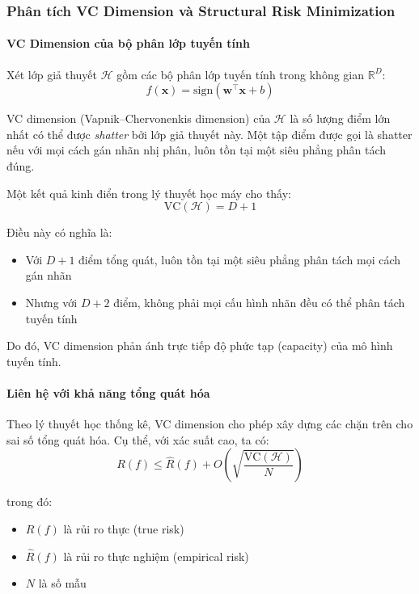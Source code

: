 \subsubsection{Phân tích VC Dimension và Structural Risk Minimization}

\paragraph{VC Dimension của bộ phân lớp tuyến tính}

Xét lớp giả thuyết $\mathcal{H}$ gồm các bộ phân lớp tuyến tính trong không gian $\mathbb{R}^D$:
\[
f(\boldsymbol{x}) = \text{sign}(\boldsymbol{w}^\intercal \boldsymbol{x} + b)
\]

VC dimension (Vapnik–Chervonenkis dimension) của $\mathcal{H}$ là số lượng điểm lớn nhất có thể được \textit{shatter} bởi lớp giả thuyết này. Một tập điểm được gọi là shatter nếu với mọi cách gán nhãn nhị phân, luôn tồn tại một siêu phẳng phân tách đúng.

Một kết quả kinh điển trong lý thuyết học máy cho thấy:
\[
\text{VC}(\mathcal{H}) = D + 1
\]

Điều này có nghĩa là:
\begin{itemize}
    \item Với $D+1$ điểm tổng quát, luôn tồn tại một siêu phẳng phân tách mọi cách gán nhãn
    \item Nhưng với $D+2$ điểm, không phải mọi cấu hình nhãn đều có thể phân tách tuyến tính
\end{itemize}

Do đó, VC dimension phản ánh trực tiếp độ phức tạp (capacity) của mô hình tuyến tính.

\paragraph{Liên hệ với khả năng tổng quát hóa}

Theo lý thuyết học thống kê, VC dimension cho phép xây dựng các chặn trên cho sai số tổng quát hóa. Cụ thể, với xác suất cao, ta có:
\[
R(f) \le \hat{R}(f) + O\left(\sqrt{\frac{\text{VC}(\mathcal{H})}{N}}\right)
\]

trong đó:
\begin{itemize}
    \item $R(f)$ là rủi ro thực (true risk)
    \item $\hat{R}(f)$ là rủi ro thực nghiệm (empirical risk)
    \item $N$ là số mẫu
\end{itemize}


